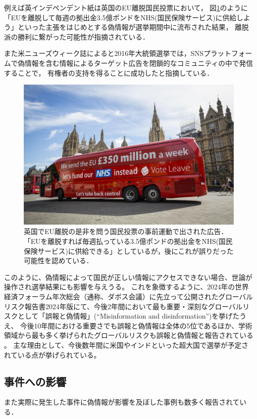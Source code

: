 例えば英インデペンデント紙は英国のEU離脱国民投票において，
図\ref{fig:leave}のように
「EUを離脱して毎週の拠出金3.5億ポンドをNHS(国民保険サービス)に供給しよう」といった主張\cite{merrick_2018}をはじめとする偽情報が選挙期間中に流布された結果，
離脱派の勝利に繋がった可能性が指摘されている\cite{grice_2017}．

また米ニューズウィーク誌によると2016年大統領選挙では，SNSプラットフォームで偽情報を含む情報によるターゲット広告を閉鎖的なコミュニティの中で発信することで，
有権者の支持を得ることに成功したと指摘している\cite{burleigh_2017}．

\begin{figure}[p]
    \includegraphics[width=\linewidth]{figures/fig_leave.jpg}
    \caption{英国でEU離脱の是非を問う国民投票の事前運動で出された広告．「EUを離脱すれば毎週払っている3.5億ポンドの拠出金をNHS(国民保険サービス)に供給できる」としているが，後にこれが誤りだった可能性を認めている\cite{merrick_2018}．}
    \label{fig:leave}
\end{figure}

このように、偽情報によって国民が正しい情報にアクセスできない場合、世論が操作され選挙結果にも影響を与えうる。
これを象徴するように、2024年の世界経済フォーラム年次総会（通称、ダボス会議）に先立って公開されたグローバルリスク報告書2024年版にて、今後2年間において最も重要・深刻なグローバルリスクとして「誤報と偽情報」(``Misinformation and disinformation'')を挙げたうえ、
今後10年間における重要さでも誤報と偽情報は全体の5位であるほか、学術領域から最も多く挙げられたグローバルリスクも誤報と偽情報と報告されている \cite{wef2024,wef2024_j}。
主な理由として、今後数年間に米国やインドといった超大国で選挙が予定されている点が挙げられている。

\subsection{事件への影響}
また実際に発生した事件に偽情報が影響を及ぼした事例も数多く報告されている．

